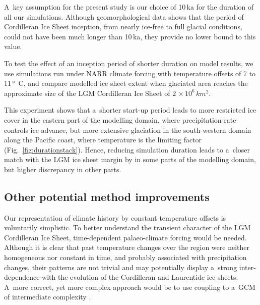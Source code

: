 \documentclass[tc, ms]{copernicus}
\begin{document}
A~key assumption for the present study is our choice of 10\,ka for the duration of all our simulations. Although geomorphological data shows that the period of Cordilleran Ice Sheet inception, from nearly ice-free to full glacial conditions, could not have been much longer than 10\,ka, they provide no lower bound to this value.

To test the effect of an inception period of shorter duration on model results, we use simulations run under NARR climate forcing with temperature offsets of 7 to 11\,\unit{\degree C}, and compare modelled ice sheet extent when glaciated area reaches the approximate size of the LGM Cordilleran Ice Sheet of $2\,\times10^6\,\unit{km^2}$.

This experiment shows that a~shorter start-up period leads to more restricted ice cover in the eastern part of the modelling domain, where precipitation rate controls ice advance, but more extensive glaciation in the south-western domain along the Pacific coast, where temperature is the limiting factor (Fig.~\ref{fig:durationstack}). Hence, reducing simulation duration leads to a~closer match with the LGM ice sheet margin by \citet{dyke-2004} in some parts of the modelling domain, but higher discrepancy in other parts.

\subsection{Other potential method improvements}

Our representation of climate history by constant temperature offsets is voluntarily simplistic. To better understand the transient character of the LGM Cordilleran Ice Sheet, time-dependent palaeo-climate forcing would be needed. Although it is clear that past temperature changes over the region were neither homogeneous nor constant in time, and probably associated with precipitation changes, their patterns are not trivial and may potentially display a~strong inter-dependence with the evolution of the Cordilleran and Laurentide ice sheets. A~more correct, yet more complex approach would be to use coupling to a~GCM of intermediate complexity \citep{yoshimori-etal-2001,calov-etal-2002,abeouchi-etal-2007,charbit-etal-2013}.
\end{document}
